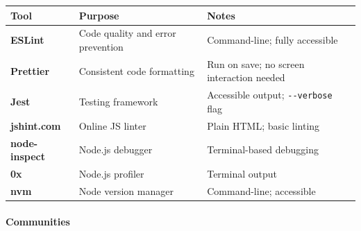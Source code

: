 \documentclass[
  justified,
  openright,
]{tufte-book}
\let\subsection\paragraph
\let\paragraph\paragraph
\let\subsection\paragraph
\let\paragraph\paragraph
\begin{document}
\begin{fullwidth}{\def\LTcaptype{none} %
\begin{longtable}[]{@{}
  >{\raggedright\arraybackslash}p{}
  >{\raggedright\arraybackslash}p{}
  >{\raggedright\arraybackslash}p{}@{}}
\toprule\noalign{}
\begin{minipage}[b]{\linewidth}\raggedright
Tool
\end{minipage} & \begin{minipage}[b]{\linewidth}\raggedright
Purpose
\end{minipage} & \begin{minipage}[b]{\linewidth}\raggedright
Notes
\end{minipage} \\
\midrule\noalign{}
\endhead
\bottomrule\noalign{}
\endlastfoot
\textbf{ESLint} & Code quality and error prevention & Command-line;
fully accessible \\
\textbf{Prettier} & Consistent code formatting & Run on save; no screen
interaction needed \\
\textbf{Jest} & Testing framework & Accessible output;
\texttt{-\/-verbose} flag \\
\textbf{jshint.com} & Online JS linter & Plain HTML; basic linting \\
\textbf{node-inspect} & Node.js debugger & Terminal-based debugging \\
\textbf{0x} & Node.js profiler & Terminal output \\
\textbf{nvm} & Node version manager & Command-line; accessible \\
\end{longtable}
}
\end{fullwidth}

\subsection{Communities}\label{communities}
\end{document}

